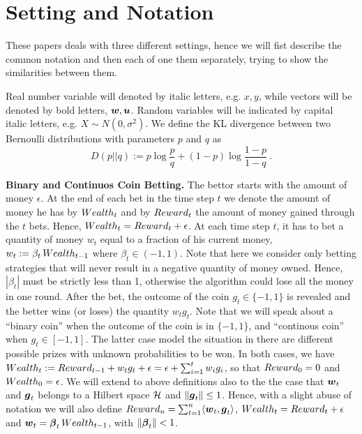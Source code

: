 \section{Setting and Notation}
These papers deals with three different settings, hence we will fist describe the common notation and then each of one them separately, trying to show the similarities between them.

Real number variable will denoted by italic letters, e.g. $x,y$, while vectors will be denoted by bold letters, $\boldsymbol{w},\boldsymbol{u}$.
Random variables will be indicated by capital italic letters, e.g. $X \sim N(0,\sigma^2)$.
We define the KL divergence between two Bernoulli distributions with parameters $p$ and $q$ as
\[
D(p||q) := p \log\frac{p}{q} + (1-p) \log\frac{1-p}{1-q}~.
\]

\vspace{0.2cm}\noindent\textbf{Binary and Continuos Coin Betting.}
The bettor starts with the amount of money $\epsilon$. 
At the end of each bet in the time step $t$ we denote the amount of money he has by $Wealth_t$ and by $Reward_t$ the amount of money gained through the $t$ bets. Hence, $Wealth_t=Reward_t+\epsilon$.
At each time step $t$, it has to bet a quantity of money $w_t$ equal to a fraction of his current money, $w_t:=\beta_t \, Wealth_{t-1}$ where $\beta_t \in (-1,1)$. Note that here we consider only betting strategies that will never result in a negative quantity of money owned. Hence, $|\beta_t|$ must be strictly less than 1, otherwise the algorithm could lose all the money in one round.
After the bet, the outcome of the coin $g_t \in \{-1,1\}$ is revealed and the better wins (or loses) the quantity $w_t g_t$.
Note that we will speak about a ``binary coin'' when the outcome of the coin is in $\{-1,1\}$, and ``continous coin'' when $g_t \in [-1,1]$. The latter case model the situation in there are different possible prizes with unknown probabilities to be won. In both cases, we have $Wealth_t:=Reward_{t-1} + w_t g_t + \epsilon= \epsilon + \sum_{i=1}^t w_i g_i$, so that $Reward_0=0$ and $Wealth_0=\epsilon$.
We will extend to above definitions also to the the case that $\boldsymbol{w}_t$ and $\boldsymbol{g}_t$ belongs to a Hilbert space $\mathcal{H}$ and $\left\|{\boldsymbol{g}_t}\right\|\leq 1$. Hence, with a slight abuse of notation we will also define $Reward_n=\sum_{t=1}^n \langle \boldsymbol{w}_t, \boldsymbol{g}_t \rangle$, $Wealth_t=Reward_t + \epsilon$ and $\boldsymbol{w}_t = \boldsymbol{\beta}_t \, Wealth_{t-1}$, with $\left\|{\boldsymbol{\beta}_t}\right\| < 1$.

